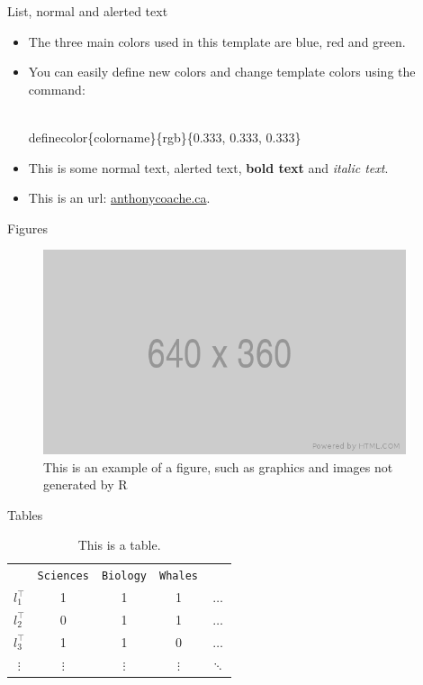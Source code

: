 \documentclass{beamer}
\begin{document}
\begin{frame}[fragile]{List, normal and alerted text}

\begin{itemize}
\setlength{\itemsep}{15pt}
\item The three main colors used in this template are \textcolor{mblue}{blue}, \textcolor{mred}{red} and \textcolor{mgreen}{green}. \\
\item You can easily define new colors and change template colors using the command: \begin{semiverbatim}\\definecolor\{colorname\}\{rgb\}\{0.333, 0.333, 0.333\}\end{semiverbatim}
\item This is some normal text, \alert{alerted text}, \textbf{bold text} and \textit{italic text}. \\
\item This is an url: \href{http://www.anthonycoache.ca}{anthonycoache.ca}.
\end{itemize}

\end{frame}


\begin{frame}{Figures}

\begin{figure}
\caption{This is an example of a figure, such as graphics and images not generated by R}
\centerline{\includegraphics[width=0.95\textwidth]{placeholder.png}}
\end{figure}

\end{frame}


\begin{frame}{Tables}

\begin{table}
\caption{This is a table.}
\begin{tabular}{c c c c c}
& \texttt{Sciences} & \texttt{Biology} & \texttt{Whales} & \\
$l_1^\top$ & 1 & 1 & 1 & $\dots$\\
$l_2^\top$ & 0 & 1 & 1 & $\dots$\\
$l_3^\top$ & 1 & 1 & 0 & $\dots$\\
$\vdots$ & $\vdots$ & $\vdots$ & $\vdots$ & $\ddots$ \\
\end{tabular}
\end{table}

\end{frame}
\end{document}

